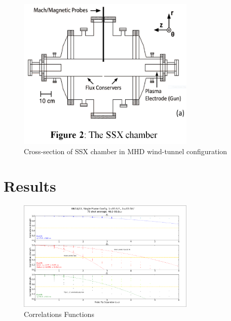 \documentclass[aip,prl,amsmath,amssymb,reprint,superscriptaddress]{revtex4-1} %
\begin{document}
\begin{figure}[!htbp]
\centerline{
\includegraphics[width=8.5cm]{chamber.png}}
\caption{\label{fig:chamber} Cross-section of SSX chamber in MHD wind-tunnel configuration}
\end{figure}

\section{Results}

\begin{figure}[!htbp]
\centerline{
\includegraphics[width=8.5cm]{BrBtBz_correlations.png}}
\caption{\label{fig:BrBtBz_correlations} Correlations Functions}
\end{figure}
\end{document}
